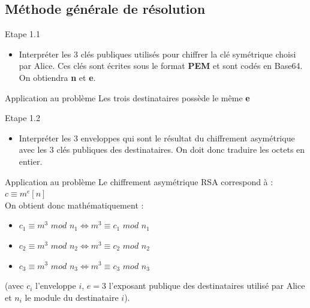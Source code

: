 \documentclass{beamer}
\begin{document}
	\subsection{Méthode générale de résolution}
    \begin{frame}
	\begin{block}{Etape 1.1}
		\begin{itemize}
		\item Interpréter les 3 clés publiques utilisés pour chiffrer la clé symétrique choisi par Alice. Ces clés sont écrites sous le format \textbf{PEM} et sont codés en Base64. On obtiendra \textbf{n} et \textbf{e}.
		\end{itemize}
	\end{block}
	\begin{exampleblock}{Application au problème}
		Les trois destinataires possède le même \textbf{e}
	\end{exampleblock}
	\end{frame}
	\begin{frame}
	\begin{block}{Etape 1.2}
		\begin{itemize}
			\item Interpréter les 3 enveloppes qui sont le résultat du chiffrement asymétrique avec les 3 clés publiques des destinataires. On doit donc traduire les octets en entier.
		\end{itemize}
	\end{block}

	\begin{exampleblock}{Application au problème}
		Le chiffrement asymétrique RSA correspond à : $c \equiv m^e [n]$ \\
		On obtient donc mathématiquement :
		\begin{itemize}
			\item $c_1 \equiv m^3$ $mod$ $n_1 \Leftrightarrow m^3 \equiv c_1$ $mod$ $n_1$
			\item $c_2 \equiv m^3$ $mod$ $n_2\Leftrightarrow m^3 \equiv c_2$ $mod$ $n_2$
			\item $c_3 \equiv m^3$ $mod$ $n_3\Leftrightarrow m^3 \equiv c_3$ $mod$ $n_3$
		\end{itemize}
		(avec $c_i$ l'enveloppe $i$, $e=3$ l'exposant publique des destinataires utilisé par Alice et $n_i$ le module du destinataire $i$).
	\end{exampleblock}
	\end{frame}
\end{document}
